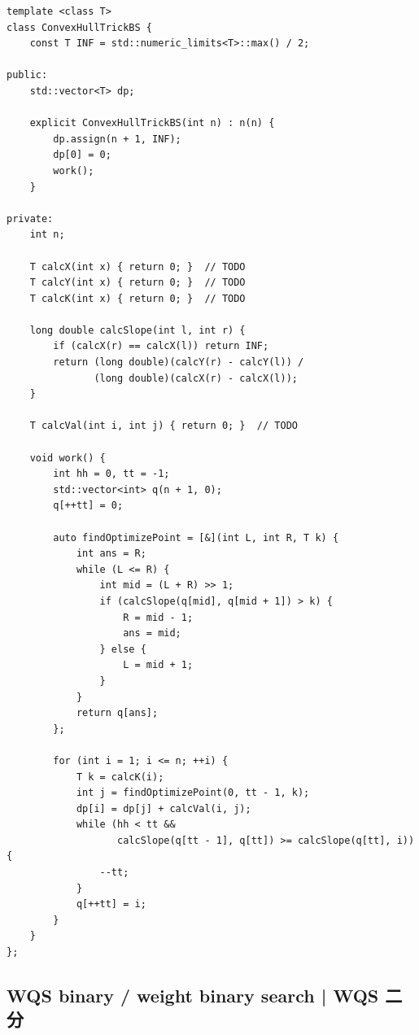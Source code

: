         \begin{lstlisting}
template <class T>
class ConvexHullTrickBS {
    const T INF = std::numeric_limits<T>::max() / 2;

public:
    std::vector<T> dp;

    explicit ConvexHullTrickBS(int n) : n(n) {
        dp.assign(n + 1, INF);
        dp[0] = 0;
        work();
    }

private:
    int n;

    T calcX(int x) { return 0; }  // TODO
    T calcY(int x) { return 0; }  // TODO
    T calcK(int x) { return 0; }  // TODO

    long double calcSlope(int l, int r) {
        if (calcX(r) == calcX(l)) return INF;
        return (long double)(calcY(r) - calcY(l)) /
               (long double)(calcX(r) - calcX(l));
    }

    T calcVal(int i, int j) { return 0; }  // TODO

    void work() {
        int hh = 0, tt = -1;
        std::vector<int> q(n + 1, 0);
        q[++tt] = 0;

        auto findOptimizePoint = [&](int L, int R, T k) {
            int ans = R;
            while (L <= R) {
                int mid = (L + R) >> 1;
                if (calcSlope(q[mid], q[mid + 1]) > k) {
                    R = mid - 1;
                    ans = mid;
                } else {
                    L = mid + 1;
                }
            }
            return q[ans];
        };

        for (int i = 1; i <= n; ++i) {
            T k = calcK(i);
            int j = findOptimizePoint(0, tt - 1, k);
            dp[i] = dp[j] + calcVal(i, j);
            while (hh < tt &&
                   calcSlope(q[tt - 1], q[tt]) >= calcSlope(q[tt], i)) {
                --tt;
            }
            q[++tt] = i;
        }
    }
};
        \end{lstlisting}

\subsection{WQS binary / weight binary search | WQS 二分}


